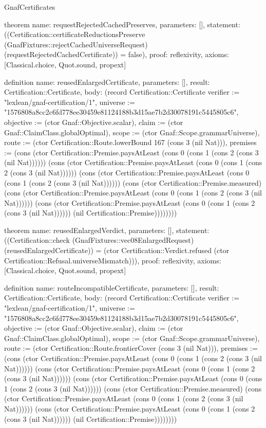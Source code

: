 \begin{lexlean}{GnafCertificates}
\begin{semanticmodule}
theorem{
  name: requestRejectedCachedPreserves,
  parameters: [],
  statement: ((Certification::certificateReductionsPreserve (GnafFixtures::rejectCachedUniverseRequest) (requestRejectedCachedCertificate)) = false),
  proof: reflexivity{},
  axioms: [Classical.choice, Quot.sound, propext]
}

definition{
  name: reusedEnlargedCertificate,
  parameters: [],
  result: Certification::Certificate,
  body: (record Certification::Certificate {verifier := "lexlean/gnaf-certification/1", universe := "1576808a8cc2c6fd778ee30459e81124188b3d15ae7b2d30078191c5445805c6", objective := (ctor Gnaf::Objective.scalar), claim := (ctor Gnaf::ClaimClass.globalOptimal), scope := (ctor Gnaf::Scope.grammarUniverse), route := (ctor Certification::Route.lowerBound 167 (cons 3 (nil Nat))), premises := (cons (ctor Certification::Premise.paysAtLeast (cons 0 (cons 1 (cons 2 (cons 3 (nil Nat)))))) (cons (ctor Certification::Premise.paysAtLeast (cons 0 (cons 1 (cons 2 (cons 3 (nil Nat)))))) (cons (ctor Certification::Premise.paysAtLeast (cons 0 (cons 1 (cons 2 (cons 3 (nil Nat)))))) (cons (ctor Certification::Premise.measured) (cons (ctor Certification::Premise.paysAtLeast (cons 0 (cons 1 (cons 2 (cons 3 (nil Nat)))))) (cons (ctor Certification::Premise.paysAtLeast (cons 0 (cons 1 (cons 2 (cons 3 (nil Nat)))))) (nil Certification::Premise)))))))})
}

theorem{
  name: reusedEnlargedVerdict,
  parameters: [],
  statement: ((Certification::check (GnafFixtures::vec08EnlargedRequest) (reusedEnlargedCertificate)) = (ctor Certification::Verdict.refused (ctor Certification::Refusal.universeMismatch))),
  proof: reflexivity{},
  axioms: [Classical.choice, Quot.sound, propext]
}

definition{
  name: routeIncompatibleCertificate,
  parameters: [],
  result: Certification::Certificate,
  body: (record Certification::Certificate {verifier := "lexlean/gnaf-certification/1", universe := "1576808a8cc2c6fd778ee30459e81124188b3d15ae7b2d30078191c5445805c6", objective := (ctor Gnaf::Objective.scalar), claim := (ctor Gnaf::ClaimClass.globalOptimal), scope := (ctor Gnaf::Scope.grammarUniverse), route := (ctor Certification::Route.frontierCover (cons 3 (nil Nat))), premises := (cons (ctor Certification::Premise.paysAtLeast (cons 0 (cons 1 (cons 2 (cons 3 (nil Nat)))))) (cons (ctor Certification::Premise.paysAtLeast (cons 0 (cons 1 (cons 2 (cons 3 (nil Nat)))))) (cons (ctor Certification::Premise.paysAtLeast (cons 0 (cons 1 (cons 2 (cons 3 (nil Nat)))))) (cons (ctor Certification::Premise.measured) (cons (ctor Certification::Premise.paysAtLeast (cons 0 (cons 1 (cons 2 (cons 3 (nil Nat)))))) (cons (ctor Certification::Premise.paysAtLeast (cons 0 (cons 1 (cons 2 (cons 3 (nil Nat)))))) (nil Certification::Premise)))))))})
}


\end{semanticmodule}
\end{lexlean}
